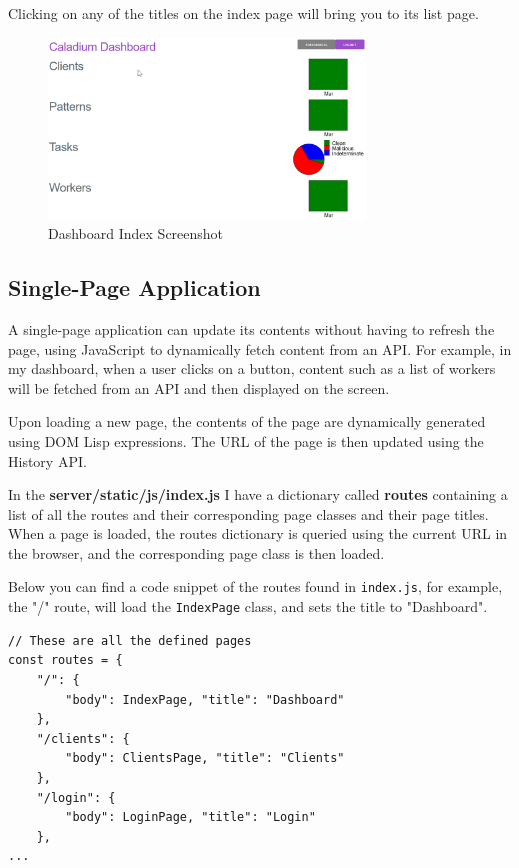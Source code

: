 Clicking on any of the titles on the index page will bring you to its list page.

\begin{figure}[h!]
    \centering
    \includegraphics[width=0.75\textwidth]{../docs/dashboard.png}
    \caption{Dashboard Index Screenshot}
    \label{image:dashboardScreenshot}
\end{figure}

\subsection{Single-Page Application}
A single-page application can update its contents
without having to refresh the page,
using JavaScript to dynamically fetch content from an API.
\cite{jadhav2015single}
For example, in my dashboard, when a user clicks on a button,
content such as a list of workers
will be fetched from an API and then displayed on the screen.

Upon loading a new page, the contents of the page are
dynamically generated using DOM Lisp expressions.
The URL of the page is then updated using the History API.

In the \textbf{server/static/js/index.js} I have a dictionary called
\textbf{routes} containing a list of all
the routes and their corresponding
page classes and their page titles.
When a page is loaded,
the routes dictionary is queried using the current URL in the browser,
and the corresponding page class is then loaded.

Below you can find a code snippet of the routes found in \texttt{index.js},
for example, the "/" route, will load the \texttt{IndexPage} class,
and sets the title to "Dashboard".
\begin{lstlisting}
// These are all the defined pages
const routes = {
    "/": {
        "body": IndexPage, "title": "Dashboard"
    },
    "/clients": {
        "body": ClientsPage, "title": "Clients"
    },
    "/login": {
        "body": LoginPage, "title": "Login"
    },
...
\end{lstlisting}

